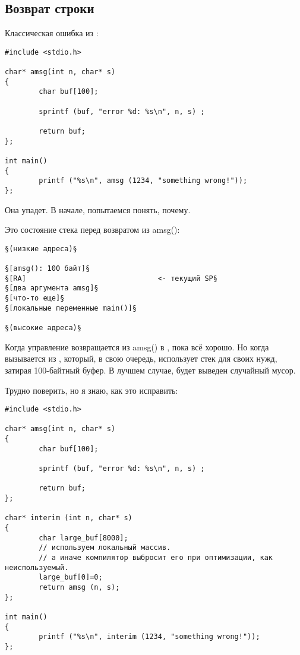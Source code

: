 \subsection{Возврат строки}

Классическая ошибка из \RobPikePractice{}:

\begin{lstlisting}[style=customc]
#include <stdio.h>

char* amsg(int n, char* s)
{
        char buf[100];

        sprintf (buf, "error %d: %s\n", n, s) ;

        return buf;
};

int main()
{
        printf ("%s\n", amsg (1234, "something wrong!"));
};
\end{lstlisting}

Она упадет.
В начале, попытаемся понять, почему.

Это состояние стека перед возвратом из amsg():

\begin{lstlisting}
§(низкие адреса)§

§[amsg(): 100 байт]§
§[RA]                               <- текущий SP§
§[два аргумента amsg]§
§[что-то еще]§
§[локальные переменные main()]§

§(высокие адреса)§
\end{lstlisting}

Когда управление возвращается из amsg() в \main, пока всё хорошо.
Но когда \printf вызывается из \main, который, в свою очередь, использует стек для своих нужд, затирая 100-байтный буфер.
В лучшем случае, будет выведен случайный мусор.

Трудно поверить, но я знаю, как это исправить:

\begin{lstlisting}[style=customc]
#include <stdio.h>

char* amsg(int n, char* s)
{
        char buf[100];

        sprintf (buf, "error %d: %s\n", n, s) ;

        return buf;
};

char* interim (int n, char* s)
{
        char large_buf[8000];
        // используем локальный массив.
        // а иначе компилятор выбросит его при оптимизации, как неиспользуемый.
        large_buf[0]=0;
        return amsg (n, s);
};

int main()
{
        printf ("%s\n", interim (1234, "something wrong!"));
};
\end{lstlisting}

